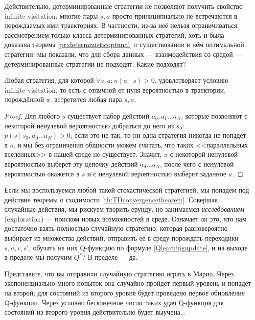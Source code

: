 Действительно, детерминированные стратегии не позволяют получить свойство infinite visitation: многие пары $s, a$ просто приниципиально не встречаются в порождаемых ими траекториях. В частности, из-за неё нельзя ограничиваться рассмотрением только класса детерминированных стратегий, хоть и была доказана теорема \ref{pr:deterministicoptimal} о существовании в нём оптимальной стратегии: мы показали, что для сбора данных --- взаимодействия со средой --- детерминированные стратегии не подходят. Какие подходят?

\begin{theorem}
Любая стратегия, для которой $\forall s, a \colon \pi(a \mid s) > 0$, удовлетворяет условию infinite visitation, то есть с отличной от нуля вероятностью в траектории, порождённой $\pi$, встретится любая пара $s, a$.
\begin{proof}
Для любого $s$ существует набор действий $a_0, a_1 \dots a_N$, которые позволяют с некоторой ненулевой вероятностью добраться до него из $s_0$: $p(s \mid s_0, a_0 \dots a_N) > 0$; если это не так, то ни одна стратегия никогда не попадёт в $s$, и мы без ограничения общности можем считать, что таких <<параллельных вселенных>> в нашей среде не существует. Значит, $\pi$ с некоторой ненулевой вероятностью выберет эту цепочку действий $a_0 \dots a_N$, после чего с ненулевой вероятностью окажется в $s$ и с ненулевой вероятностью выберет заданное $a$.
\end{proof}
\end{theorem}

Если мы воспользуемся любой такой стохастической стратегией, мы попадём под действие теоремы о сходимости \ref{th:TDconvergencetheorem}. Совершая случайные действия, мы рискуем творить ерунду, но занимаемся \emph{исследованием} (exploration) --- поиском новых возможностей в среде. Означает ли это, что нам достаточно взять полностью случайную стратегию, которая равновероятно выбирает из множества действий, отправить её в среду порождать переходики $s, a, r, s'$, обучать на них Q-функцию по формуле \eqref{Qlearningupdate}, и на выходе в пределе мы получим $Q^*$? В пределе --- да.

\begin{example}
Представьте, что вы отправили случайную стратегию играть в Марио. Через экспоненциально много попыток она случайно пройдёт первый уровень и попадёт на второй; для состояний из второго уровня будет проведено первое обновление Q-функции. Через условно бесконечное число таких удач Q-функция для состояний из второго уровня действительно будет выучена...
\end{example}

